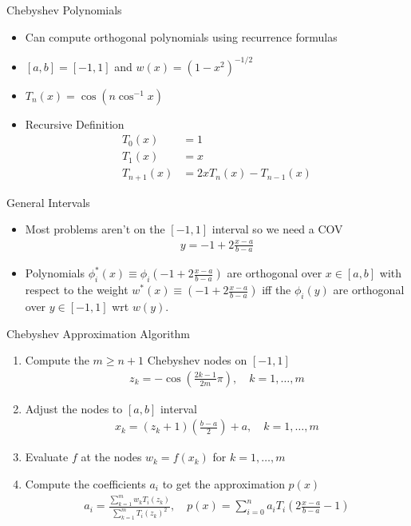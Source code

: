 \begin{frame}{Chebyshev Polynomials}
\small
\begin{itemize}
\item Can compute orthogonal polynomials using recurrence formulas
\item $[a,b] = [-1,1]$ and $w(x) = (1-x^2)^{-1/2}$
\item $T_n(x) = \cos(n \cos^{-1} x)$
\item Recursive Definition 
\vspace{-1cm}
\begin{align*}
T_0(x) &= 1\\
T_1(x) &= x\\
T_{n+1}(x) &= 2x T_n(x) - T_{n-1}(x)
\end{align*}
\end{itemize}
\begin{block}{General Intervals}
\begin{itemize}
\item Most problems aren't on the $[-1,1]$ interval so we need a COV
\begin{align*}
y = -1 + 2 \frac{x-a}{b-a}
\end{align*}
\item Polynomials $\phi_i^{*}(x) \equiv \phi_i (-1 + 2 \frac{x-a}{b-a})$ are orthogonal over $x \in[a,b]$ with respect to the weight $w^{*}(x) \equiv (-1 + 2 \frac{x-a}{b-a})$ iff the $\phi_i(y)$ are orthogonal over $y\in[-1,1]$ wrt $w(y)$.
\end{itemize} 
\end{block}
\end{frame}

\begin{frame}{Chebyshev Approximation Algorithm}
\small
\begin{enumerate}
\item Compute the $m \geq n+1$ Chebyshev nodes on $[-1,1]$
\begin{eqnarray*}
z_k = -\cos \left ( \frac{2k-1}{2m} \pi \right) , \quad k=1,\ldots,m
\end{eqnarray*}
\item Adjust the nodes to $[a,b]$ interval
\begin{eqnarray*}
x_k = (z_k + 1)\left(\frac{b-a}{2} \right) + a , \quad k=1,\ldots,m
\end{eqnarray*}
\item Evaluate $f$ at the nodes $w_k = f(x_k)$ for $ k=1,\ldots,m$
\item Compute the coefficients $a_i$ to get the approximation $p(x)$
\begin{eqnarray*}
a_i = \frac{\sum_{k=1}^m w_k T_i(z_k)}{\sum_{k=1}^m  T_i(z_k)^2}, \quad
p(x) = \sum_{i=0}^n a_i T_i \left( 2 \frac{x-a}{b-a} -1 \right) 
\end{eqnarray*}
\end{enumerate}
\end{frame}

